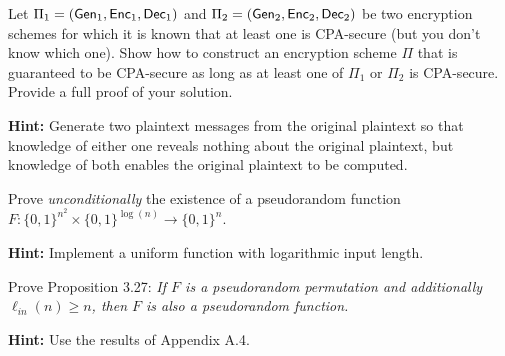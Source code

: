 \documentclass[a4paper,10pt,landscape,twocolumn]{scrartcl}
\begin{document}
\begin{exercise}
  Let $\Pi_1 = (\mathsf{Gen}_1,\mathsf{Enc}_1, \mathsf{Dec}_1)$ and $\Pi_2 = (\mathsf{Gen}_2,\mathsf{Enc}_2, \mathsf{Dec}_2)$ be two encryption schemes for which it is known that at least one is CPA-secure (but you don't know which one). Show how to construct an encryption scheme $\Pi$ that is guaranteed to be CPA-secure as long as at least one of $\Pi_1$ or $\Pi_2$ is CPA-secure. Provide a full proof of your solution.

  \textbf{Hint:} Generate two plaintext messages from the original plaintext so that knowledge of either one reveals nothing about the original plaintext, but knowledge of both enables the original plaintext to be computed.
\end{exercise}





\begin{bonusexercise}
  Prove \emph{unconditionally} the existence of a pseudorandom function $F : \{0,1\}^{n^2} \times \{0,1\}^{\log(n)} \to \{0,1\}^n$.

  \textbf{Hint:} Implement a uniform function with logarithmic input length.
\end{bonusexercise}

\begin{bonusexercise}
  Prove Proposition 3.27:
  \textit{
If $F$ is a pseudorandom permutation and additionally $\ell_{in}(n) \geq n$, then $F$ is also a pseudorandom function.
  }

\textbf{Hint:} Use the results of Appendix A.4.
\end{bonusexercise}
\end{document}
